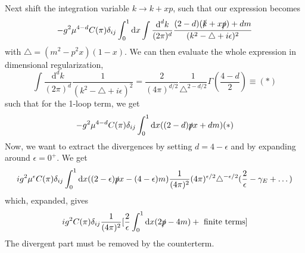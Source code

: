 \documentclass[a4paper]{book}
\theoremstyle{definition}
\theoremstyle{remark}
\begin{document}
Next shift the integration variable $k\rightarrow k + xp$, such that our expression becomes 
\begin{equation}
    -g^2 \mu^{4-d} C(\pi)\delta_{ij} \int_0^1 \text{d}x \int\frac{\text{d}^dk}{(2\pi)^d}\frac{(2-d)(\slashed{k} + x\slashed{p}) + dm}{(k^2 - \triangle + i\epsilon)^2}
\end{equation}
with $\triangle = (m^2 - p^2x)(1-x)$. We can then evaluate the whole expression in dimensional regularization, 
\begin{equation}
    \int\frac{\text{d}^dk}{(2\pi)^d}\frac{1}{(k^2 - \triangle + i\epsilon)^2} = \frac{2}{(4\pi)^{d/2}} \frac{1}{\triangle^{2-d/2}}\Gamma(\frac{4-d}{2}) \equiv (*)
\end{equation}
such that for the 1-loop term, we get 
\begin{equation}
    -g^2 \mu^{4-d} C(\pi) \delta_{ij} \int_0^1 \text{d}x ((2-d)\slashed{p}x + dm) (*)
\end{equation}
Now, we want to extract the divergences by setting $d = 4-\epsilon$ and by expanding around $\epsilon = 0^+$. We get
\begin{equation}
    ig^2 \mu^\epsilon C(\pi) \delta_{ij} \int_0^1 \text{d}x ((2-\epsilon )\slashed{p}x- (4-\epsilon)m)\frac{1}{(4\pi)^2}(4\pi)^{\epsilon/2} \triangle^{-\epsilon/2} (\frac{2}{\epsilon} - \gamma_E + \dots)
\end{equation}
which, expanded, gives 
\begin{equation}
    ig^2 C(\pi)\delta_{ij} \frac{1}{(4\pi)^2} [\frac{2}{\epsilon}\int_0^1 \text{d}x (2\slashed{p} - 4m) + \text{ finite terms}]
\end{equation}
The divergent part must be removed by the counterterm. 
\end{document}
